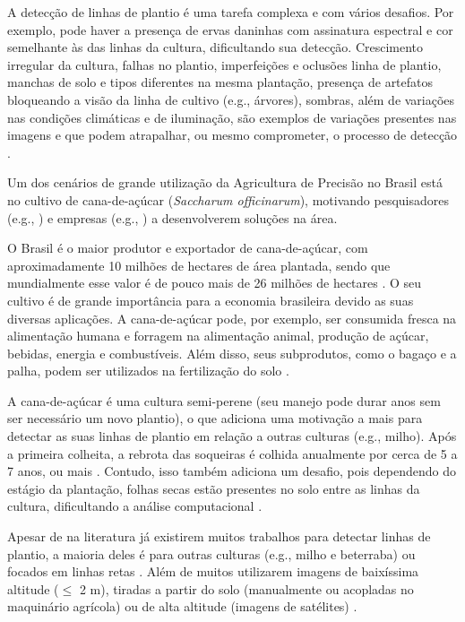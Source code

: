 \documentclass[12pt, a4paper, english, brazil]{article}
\begin{document}
A detecção de linhas de plantio é uma tarefa complexa e com vários desafios. Por exemplo, pode haver a presença de ervas daninhas com assinatura espectral e cor semelhante às das linhas da cultura, dificultando sua detecção. Crescimento irregular da cultura, falhas no plantio, imperfeições e oclusões linha de plantio, manchas de solo e tipos diferentes na mesma plantação, presença de artefatos bloqueando a visão da linha de cultivo (e.g., árvores), sombras, além de variações nas condições climáticas e de iluminação, são exemplos de variações presentes nas imagens e que podem atrapalhar, ou mesmo comprometer, o processo de detecção \cite{Rabab_2021, Doha_2021}.

Um dos cenários de grande utilização da Agricultura de Precisão no Brasil está no cultivo de cana-de-açúcar (\textit{Saccharum officinarum}), motivando pesquisadores (e.g., ) e empresas (e.g., ) a desenvolverem soluções na área.

O Brasil é o maior produtor e exportador de cana-de-açúcar, com aproximadamente 10 milhões de hectares de área plantada, sendo que mundialmente esse valor é de pouco mais de 26 milhões de hectares \cite{Ritchie_2020, IBGE_2021, FAOSTAT_2021}. O seu cultivo é de grande importância para a economia brasileira devido as suas diversas aplicações. A cana-de-açúcar pode, por exemplo, ser consumida fresca na alimentação humana e forragem na alimentação animal, produção de açúcar, bebidas, energia e combustíveis. Além disso, seus subprodutos, como o bagaço e a palha, podem ser utilizados na fertilização do solo \cite{Oliveira_2018}.

A cana-de-açúcar é uma cultura semi-perene (seu manejo pode durar anos sem ser necessário um novo plantio), o que adiciona uma motivação a mais para detectar as suas linhas de plantio em relação a outras culturas (e.g., milho). Após a primeira colheita, a rebrota das soqueiras é colhida anualmente por cerca de 5 a 7 anos, ou mais \cite{Rudorff_2010}. Contudo, isso também adiciona um desafio, pois dependendo do estágio da plantação, folhas secas estão presentes no solo entre as linhas da cultura, dificultando a análise computacional \cite{Silva_2020}.

Apesar de na literatura já existirem muitos trabalhos para detectar linhas de plantio, a maioria deles é para outras culturas (e.g., milho e beterraba) ou focados em linhas retas \cite{Pereira_Junior_2020}. Além de muitos utilizarem imagens de baixíssima altitude ($\le$ 2 m), tiradas a partir do solo (manualmente ou acopladas no maquinário agrícola) ou de alta altitude (imagens de satélites) \cite{Hasan_2021}.
\end{document}
